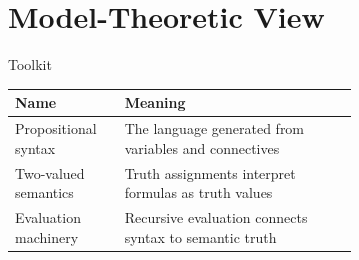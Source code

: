 \section{Model-Theoretic View}

\begin{toolkitbox}{Toolkit}
\small
\begin{tabular}{l p{0.68\linewidth}}
\toprule
\textbf{Name} & \textbf{Meaning} \\
\midrule
Propositional syntax & The language generated from variables and connectives \\
Two-valued semantics & Truth assignments interpret formulas as truth values \\
Evaluation machinery & Recursive evaluation connects syntax to semantic truth \\
\bottomrule
\end{tabular}
\end{toolkitbox}




